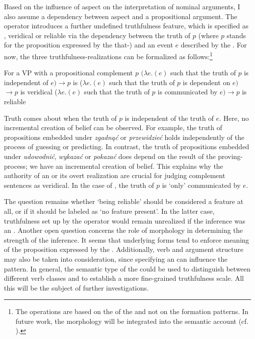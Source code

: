\documentclass[output=paper,  modfonts,  newtxmath,  hidelinks		  ]{langscibook}
\begin{document}
Based on the influence of aspect on the interpretation of nominal arguments, I also assume a dependency between aspect and a propositional argument. The  operator  introduces a further undefined truthfulness feature, which is specified as , veridical or reliable via the dependency between the truth of $p$ (where $p$ stands for the proposition expressed by the that-) and an event $e$ described by the . For now, the three truthfulness-realizations can be formalized as follows:\footnote{The operations are based on the  of the  and not on the formation patterns. In future work, the morphology will be integrated into the semantic account (cf. \citealt{Młynarczyk2004}).}

\newpage 
\ea For a VP with a propositional complement $p$
\ea {}\hspace{1pt}$(\lambda e.$$(e)$ such that the truth of $p$ is independent of $e)$\newline$\rightarrow p$ is 
\ex {}\hspace{1pt}($\lambda e.$$(e)$ such that the truth of $p$ is dependent on $e)$\newline$\rightarrow p$ is veridical
\ex {}\hspace{1pt}($\lambda e.$$(e)$ such that the truth of $p$ is communicated by $e)$\newline$\rightarrow p$ is reliable
\z
\z



\noindent Truth  comes about when the truth of $p$ is independent of the truth of $e$. Here, no incremental creation of belief can be observed. For example, the truth of propositions embedded under \textit{zgadnąć} or \textit{przewidzieć} holds independently of the process of guessing or predicting. In contrast, the truth of propositions embedded under \textit{udowodnić}, \textit{wykazać} or \textit{pokazać} does depend on the result of the proving-process; we have an incremental creation of belief. This explains why the authority of an  or its overt realization are crucial for judging complement sentences as veridical. In the case of , the truth of $p$ is ‘only’ communicated by $e$.

The question remains whether ‘being reliable’ should be considered a feature at all, or if it should be labeled as ‘no feature present’. In the latter case, truthfulness set up by the  operator would remain unrealized if the inference was an . Another open question concerns the role of morphology in determining the strength of the inference. It seems that  underlying forms tend to enforce  meaning of the proposition expressed by the . Additionally, verb  and argument structure may also be taken into consideration, since specifying an  can influence the  pattern. In general, the semantic type of the  could be used to distinguish between different verb classes and to establish a more fine-grained truthfulness scale. All this will be the subject of further investigations.
\end{document}
